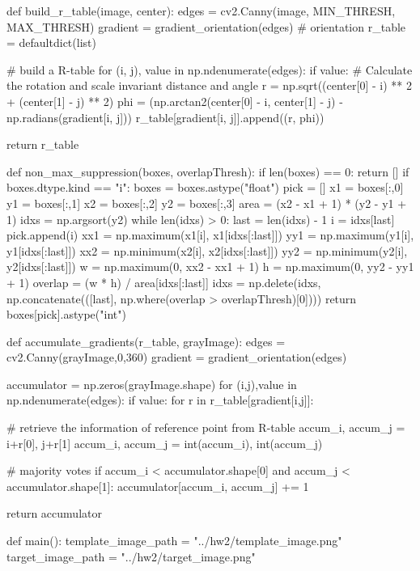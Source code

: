 \documentclass[10pt]{article}
\begin{document}
\begin{python}
def build_r_table(image, center):
    edges = cv2.Canny(image, MIN_THRESH, MAX_THRESH)
    gradient = gradient_orientation(edges)  # orientation
    r_table = defaultdict(list)

    # build a R-table
    for (i, j), value in np.ndenumerate(edges):
        if value:
            # Calculate the rotation and scale invariant distance and angle
            r = np.sqrt((center[0] - i) ** 2 + (center[1] - j) ** 2)
            phi = (np.arctan2(center[0] - i, center[1] - j) - np.radians(gradient[i, j])) %
            r_table[gradient[i, j]].append((r, phi))

    return r_table

def non_max_suppression(boxes, overlapThresh):
    if len(boxes) == 0:
        return []
    if boxes.dtype.kind == "i":
        boxes = boxes.astype("float")
    pick = []
    x1 = boxes[:,0]
    y1 = boxes[:,1]
    x2 = boxes[:,2]
    y2 = boxes[:,3]
    area = (x2 - x1 + 1) * (y2 - y1 + 1)
    idxs = np.argsort(y2)
    while len(idxs) > 0:
        last = len(idxs) - 1
        i = idxs[last]
        pick.append(i)
        xx1 = np.maximum(x1[i], x1[idxs[:last]])
        yy1 = np.maximum(y1[i], y1[idxs[:last]])
        xx2 = np.minimum(x2[i], x2[idxs[:last]])
        yy2 = np.minimum(y2[i], y2[idxs[:last]])
        w = np.maximum(0, xx2 - xx1 + 1)
        h = np.maximum(0, yy2 - yy1 + 1)
        overlap = (w * h) / area[idxs[:last]]
        idxs = np.delete(idxs, np.concatenate(([last], np.where(overlap > overlapThresh)[0])))
    return boxes[pick].astype("int")

def accumulate_gradients(r_table, grayImage):
    edges = cv2.Canny(grayImage,0,360)
    gradient = gradient_orientation(edges)
    
    accumulator = np.zeros(grayImage.shape)
    for (i,j),value in np.ndenumerate(edges):
        if value:
            for r in r_table[gradient[i,j]]:

                # retrieve the information of reference point from R-table
                accum_i, accum_j = i+r[0], j+r[1]
                accum_i, accum_j = int(accum_i), int(accum_j)

                # majority votes
                if accum_i < accumulator.shape[0] and accum_j < accumulator.shape[1]:
                    accumulator[accum_i, accum_j] += 1
                    
    return accumulator

def main():
    template_image_path = "../hw2/template_image.png"
    target_image_path = "../hw2/target_image.png"


\end{python}
\end{document}
